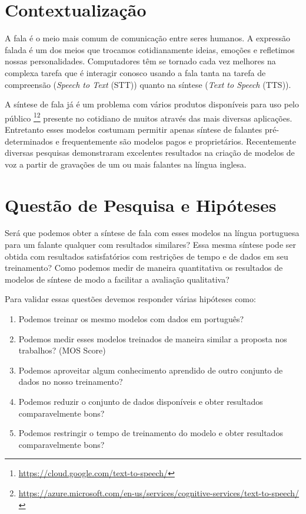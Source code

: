 \documentclass{article}
\begin{document}
\section{Contextualização}
A fala é o meio mais comum de comunicação entre seres humanos\cite{flanang}. 
A expressão falada é um dos meios que trocamos cotidianamente ideias, emoções e refletimos nossas personalidades\cite{Tiwari2012}. 
Computadores têm se tornado cada vez melhores na complexa tarefa que é interagir conosco usando a fala \cite{HCI-voice} tanta na tarefa de compreensão (\emph{Speech to Text} (STT)) quanto na síntese (\emph{Text to Speech} (TTS)). 

A síntese de fala já é um problema com vários produtos disponíveis para uso pelo público \footnote{\url{https://cloud.google.com/text-to-speech/}}\footnote{\url{https://azure.microsoft.com/en-us/services/cognitive-services/text-to-speech/}} presente no cotidiano de muitos através das mais diversas aplicações.
Entretanto esses modelos costumam permitir apenas síntese de falantes pré-determinados e frequentemente são modelos pagos e proprietários. 
Recentemente diversas pesquisas demonstraram excelentes resultados na criação de modelos de voz a partir de gravações de um ou mais falantes na língua inglesa\cite{deepvoice3:DBLP:journals/corr/abs-1710-07654,baidu_voice_clonning:DBLP:journals/corr/abs-1802-06006,facebook:DBLP:journals/corr/TaigmanWPN17,speech_adaptation,wavenet,deepVoice,deepVoice2,deepvoice3:DBLP:journals/corr/abs-1710-07654}.

\section{Questão de Pesquisa e Hipóteses}

Será que podemos obter a síntese de fala com esses modelos na língua portuguesa para um falante qualquer com resultados similares?
Essa mesma síntese pode ser obtida com resultados satisfatórios com restrições de tempo e de dados em seu treinamento?
Como podemos medir de maneira quantitativa os resultados de modelos de síntese de modo a facilitar a avaliação qualitativa?

Para validar essas questões devemos responder várias hipóteses como:

\begin{enumerate}
	\item \label{it:h1} Podemos treinar os mesmo modelos com dados em português?
	\item \label{it:h2} Podemos medir esses modelos treinados de maneira similar a proposta nos trabalhos? (MOS Score)
	\item \label{it:h3} Podemos aproveitar algum conhecimento aprendido de outro conjunto de dados no nosso treinamento? 
	\item \label{it:h4} Podemos reduzir o conjunto de dados disponíveis e obter resultados comparavelmente bons?
	\item \label{it:h5} Podemos restringir o tempo de treinamento do modelo e obter resultados comparavelmente bons?
\end{enumerate}
\end{document}
